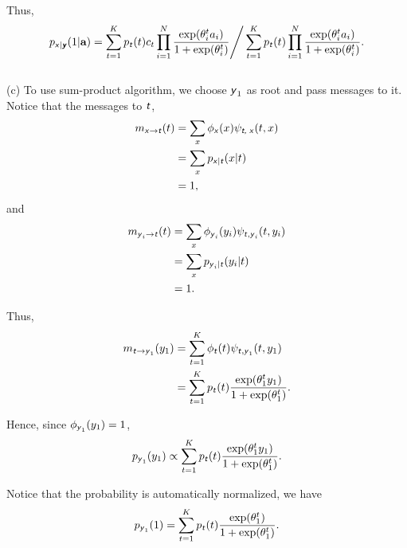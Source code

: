 \documentclass{article}
\newcommand{\s}[1]{\textsf{\textit{#1}}}
\begin{document}
Thus, 
\begin{align*}
p_{\s{x}|\s{\textbf{y}}}(1|\textbf{a}) = \sum_{t=1}^K p_{\s{t}}(t)c_t\prod_{i=1}^{N}\frac{\exp(\theta^t_i a_i)}{1 + \exp(\theta^t_i)} \Bigg/ \sum_{t=1}^K p_{\s{t}}(t)\prod_{i=1}^{N}\frac{\exp(\theta^t_i a_i)}{1 + \exp(\theta^t_i)}.
\end{align*}
\\

%
(c) To use sum-product algorithm, we choose $\s{y}_1$ as root and pass messages to it. Notice that the messages to $\s{t}$,
\begin{align*}
	m_{\s{x}\to\s{t}}(t) &= \sum_x \phi_{\s{x}}(x)\psi_{\s{t, x}}(t, x)\\
	&= \sum_x p_{\s{x}|\s{t}}(x|t)\\
	&=1,
\end{align*}
and
\begin{align*}
	m_{\s{y}_i\to\s{t}}(t) &= \sum_x \phi_{\s{y}_i}(y_i)\psi_{\s{t},\s{y}_i}(t, y_i)\\
	&= \sum_x p_{\s{y}_i|\s{t}}(y_i|t)\\
	&=1.
\end{align*}

Thus, 
\begin{align*}
	m_{\s{t}\to\s{y}_1}(y_1) &= \sum_{t=1}^{K}\phi_{\s{t}}(t)\psi_{\s{t},\s{y}_1}(t, y_1)\\
	&= \sum_{t=1}^{K}p_{\s{t}}(t)\frac{\exp(\theta_1^ty_1)}{1 + \exp(\theta_1^t)}.
\end{align*}

Hence, since  $\phi_{\s{y}_1}(y_1)=1$,
\begin{align*}
	p_{\s{y}_1}(y_1) \propto \sum_{t=1}^{K}p_{\s{t}}(t)\frac{\exp(\theta_1^ty_1)}{1 + \exp(\theta_1^t)}.
\end{align*}

Notice that the probability is automatically normalized, we have
\begin{align*}
	p_{\s{y}_1}(1) = \sum_{t=1}^{K}p_{\s{t}}(t)\frac{\exp(\theta_1^t)}{1 + \exp(\theta_1^t)}.
\end{align*}
\end{document}
